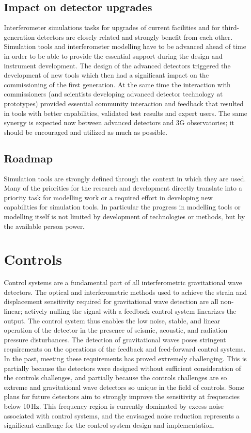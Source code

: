 \subsection{Impact on detector upgrades}
Interferometer simulations tasks for upgrades of current facilities and for third-generation detectors are closely related and strongly benefit from each other. Simulation tools and interferometer modelling have to be advanced ahead of time in order to be able to provide the essential
support during the design and instrument development. The design of the advanced detectors triggered the development of new tools which then had a significant impact on the commissioning of the first generation. At the same time the interaction with commissioners (and scientists developing advanced detector
technology at prototypes) provided essential community interaction and feedback that resulted in tools with better capabilities, validated test results and expert users. The same synergy is expected now between advanced detectors and 3G observatories; it should be encouraged and utilized as much as possible.

\subsection{Roadmap}
Simulation tools are strongly defined through the context in which they are used. Many of the priorities for the research and development directly translate into a priority task for modelling work or a required effort in developing new capabilities for simulation tools. In particular the progress in modelling tools or modelling itself is not limited by development of technologies or methods, but by the available person power.

\section{Controls}
\label{sec:Controls}
Control systems are a fundamental part of all interferometric gravitational wave detectors. The optical and interferometric methods used to achieve the strain and displacement sensitivity required for gravitational wave detection are all non-linear; actively nulling the signal with a feedback control system linearizes the output. The control system thus enables the low noise, stable, and linear operation of the detector in the presence of seismic, acoustic, and radiation pressure disturbances.
The detection of gravitational waves poses stringent requirements on the operations of the feedback and feed-forward control systems.
In the past, meeting these requirements has proved extremely challenging.
This is partially because the detectors were designed without sufficient consideration of the controls challenges, and partially because the controls challenges are so extreme and gravitational wave detectors so unique in the field of controls.
Some plans for future detectors aim to strongly improve the sensitivity at frequencies below 10\,Hz. This frequency region is currently dominated by excess noise associated with control systems, and the envisaged noise reduction represents a significant challenge for the control system design and implementation.

